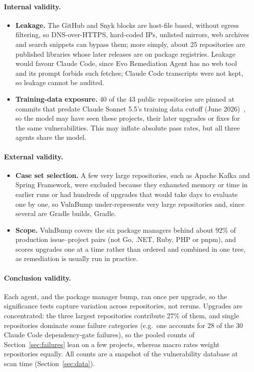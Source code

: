 \documentclass[11pt]{article}
\theoremstyle{definition}
\newcommand{\bench}{VulnBump}
\newcommand{\evo}{Evo Remediation Agent}
\newcommand{\pmbump}{package manager bump}
\begin{document}
\paragraph{Internal validity.}
\begin{itemize}
  \item \textbf{Leakage.} The GitHub and Snyk blocks are host-file based, without egress filtering, so DNS-over-HTTPS, hard-coded IPs, unlisted mirrors, web archives and search snippets can bypass them; more simply, about 25 repositories are published libraries whose later releases are on package registries. Leakage would favour Claude Code, since \evo{} has no web tool and its prompt forbids such fetches; Claude Code transcripts were not kept, so leakage cannot be audited.
  \item \textbf{Training-data exposure.} 40 of the 43 public repositories are pinned at commits that predate Claude Sonnet 5.5's training data cutoff (June 2026)~\cite{anthropicmodels}, so the model may have seen these projects, their later upgrades or fixes for the same vulnerabilities. This may inflate absolute pass rates, but all three agents share the model.
\end{itemize}

\paragraph{External validity.}
\begin{itemize}
  \item \textbf{Case set selection.} A few very large repositories, such as Apache Kafka and Spring Framework, were excluded because they exhausted memory or time in earlier runs or had hundreds of upgrades that would take days to evaluate one by one, so \bench{} under-represents very large repositories and, since several are Gradle builds, Gradle.
  \item \textbf{Scope.} \bench{} covers the six package managers behind about 92\% of production issue--project pairs (not Go, .NET, Ruby, PHP or pnpm), and scores upgrades one at a time rather than ordered and combined in one tree, as remediation is usually run in practice.
\end{itemize}

\paragraph{Conclusion validity.} Each agent, and the \pmbump{}, ran once per upgrade, so the significance tests capture variation across repositories, not reruns. Upgrades are concentrated: the three largest repositories contribute 27\% of them, and single repositories dominate some failure categories (e.g.\ one accounts for 28 of the 30 Claude Code dependency-gate failures), so the pooled counts of Section~\ref{sec:failures} lean on a few projects, whereas macro rates weight repositories equally. All counts are a snapshot of the vulnerability database at scan time (Section~\ref{sec:data}).
\end{document}
